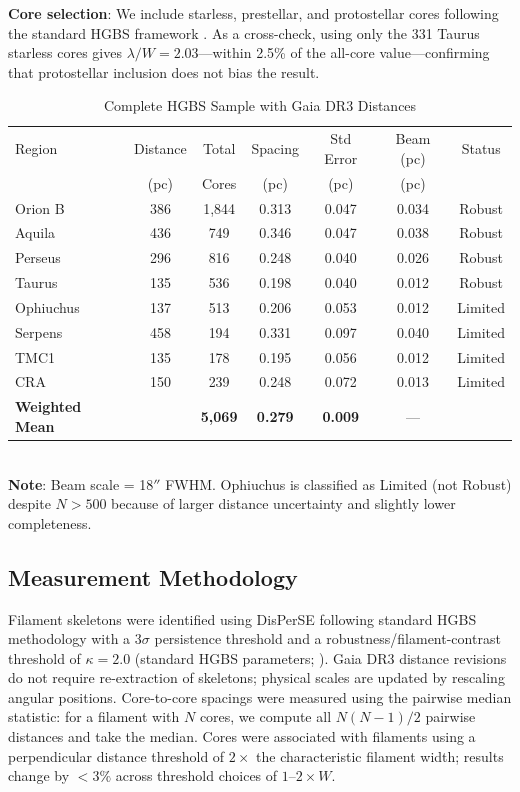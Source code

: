 \documentclass[twoside,twocolumn]{mnras}
\begin{document}
\textbf{Core selection}: We include starless, prestellar, and protostellar cores following the standard HGBS framework \citep{Konyves2015, Konyves2020}. As a cross-check, using only the 331 Taurus starless cores gives $\lambda/W = 2.03$---within 2.5\% of the all-core value---confirming that protostellar inclusion does not bias the result.

\begin{table}
\caption{Complete HGBS Sample with Gaia DR3 Distances}
\label{tab:sample}
\begin{tabular}{lcccccc}
\toprule
Region & Distance & Total & Spacing & Std Error & Beam (pc) & Status \\
       & (pc)   & Cores & (pc)   & (pc)      & (pc) & \\
\midrule
Orion B  & 386 & 1,844 & 0.313 & 0.047 & 0.034 & Robust \\
Aquila   & 436 & 749   & 0.346 & 0.047 & 0.038 & Robust \\
Perseus  & 296 & 816   & 0.248 & 0.040 & 0.026 & Robust \\
Taurus   & 135 & 536   & 0.198 & 0.040 & 0.012 & Robust \\
Ophiuchus& 137 & 513   & 0.206 & 0.053 & 0.012 & Limited \\
Serpens  & 458 & 194   & 0.331 & 0.097 & 0.040 & Limited \\
TMC1     & 135 & 178   & 0.195 & 0.056 & 0.012 & Limited \\
CRA      & 150 & 239   & 0.248 & 0.072 & 0.013 & Limited \\
\midrule
\textbf{Weighted Mean} &  & \textbf{5,069} & \textbf{0.279} & \textbf{0.009} & --- &  \\
\bottomrule
\end{tabular}
\\ \footnotesize \textbf{Note}: Beam scale = 18$''$ FWHM. Ophiuchus is classified as Limited (not Robust) despite $N>500$ because of larger distance uncertainty and slightly lower completeness.
\end{table}

\subsection{Measurement Methodology}

Filament skeletons were identified using DisPerSE \citep{Sousbie2011} following standard
HGBS methodology with a $3\sigma$ persistence threshold and a robustness/filament-contrast
threshold of $\kappa = 2.0$ (standard HGBS parameters; \citealt{Arzoumanian2011}). Gaia DR3 distance revisions
do not require re-extraction of skeletons; physical scales are updated by rescaling
angular positions. Core-to-core spacings were measured using the pairwise median
statistic: for a filament with $N$ cores, we compute all $N(N-1)/2$ pairwise distances
and take the median. Cores were associated with filaments using a perpendicular
distance threshold of $2\times$ the characteristic filament width; results change
by $<3\%$ across threshold choices of $1$--$2\times W$.
\end{document}
